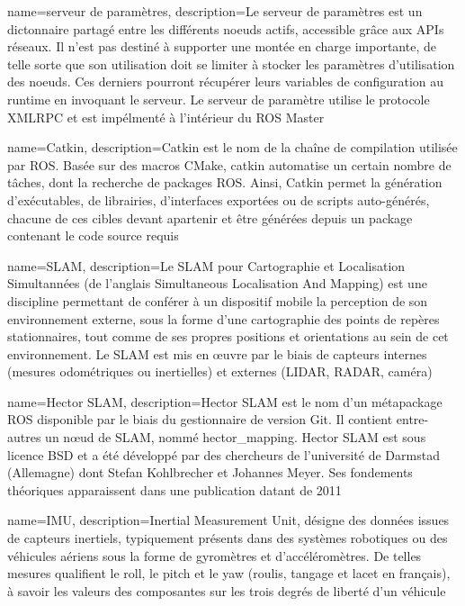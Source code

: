 {
  name={serveur de paramètres},
    description={Le serveur de paramètres est un dictonnaire partagé entre les différents noeuds actifs, accessible grâce aux APIs réseaux. 
    Il n'est pas destiné à supporter une montée en charge importante, de telle sorte que son utilisation doit se limiter à stocker les paramètres d'utilisation des noeuds. 
    Ces derniers pourront récupérer leurs variables de configuration au runtime en invoquant le serveur.
    Le serveur de paramètre utilise le protocole XMLRPC et est impélmenté à l'intérieur du ROS Master}
}

{
  name={Catkin},
    description={Catkin est le nom de la chaîne de compilation utilisée par ROS. 
    Basée sur des macros CMake, catkin automatise un certain nombre de tâches, dont la recherche de packages ROS. 
    Ainsi, Catkin permet la génération d'exécutables, de librairies, d'interfaces exportées ou de scripts auto-générés, 
    chacune de ces cibles devant apartenir et être générées depuis un package contenant le code source requis}
}

{
  name={SLAM},
    description={Le SLAM pour Cartographie et Localisation Simultannées (de l'anglais Simultaneous Localisation And Mapping) est une discipline permettant 
    de conférer à un dispositif mobile la perception de son environnement externe, sous la forme d'une cartographie des points de repères stationnaires, tout comme de ses 
    propres positions et orientations au sein de cet environnement. 
    Le SLAM est mis en \oe{}uvre par le biais de capteurs internes (mesures odométriques ou inertielles) et externes (LIDAR, RADAR, caméra)}
}

{
  name={Hector SLAM},
    description={Hector SLAM est le nom d'un métapackage ROS disponible par le biais du gestionnaire de version Git. 
    Il contient entre-autres un n\oe{}ud de SLAM, nommé hector\_mapping. Hector SLAM est sous licence BSD et a été développé par des chercheurs de l'université de Darmstad (Allemagne) dont 
    Stefan Kohlbrecher et Johannes Meyer. Ses fondements théoriques apparaissent dans une publication datant de 2011\cite{Bib_Hector_SLAM}}
}

{
  name={IMU},
    description={Inertial Measurement Unit, désigne des données issues de capteurs inertiels, typiquement présents dans des systèmes robotiques ou des véhicules aériens sous la forme de gyromètres et d'accéléromètres.
    De telles mesures qualifient le roll, le pitch et le yaw (roulis, tangage et lacet en français), à savoir les valeurs des composantes sur les trois degrés de liberté d'un véhicule }
}

